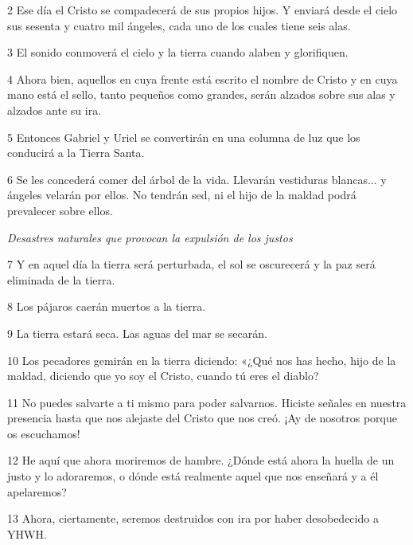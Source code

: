 \par 2 Ese día el Cristo se compadecerá de sus propios hijos. Y enviará desde el cielo sus sesenta y cuatro mil ángeles, cada uno de los cuales tiene seis alas.

\par 3 El sonido conmoverá el cielo y la tierra cuando alaben y glorifiquen.

\par 4 Ahora bien, aquellos en cuya frente está escrito el nombre de Cristo y en cuya mano está el sello, tanto pequeños como grandes, serán alzados sobre sus alas y alzados ante su ira.

\par 5 Entonces Gabriel y Uriel se convertirán en una columna de luz que los conducirá a la Tierra Santa.

\par 6 Se les concederá comer del árbol de la vida. Llevarán vestiduras blancas... y ángeles velarán por ellos. No tendrán sed, ni el hijo de la maldad podrá prevalecer sobre ellos.

\par \textit{Desastres naturales que provocan la expulsión de los justos}

\par 7 Y en aquel día la tierra será perturbada, el sol se oscurecerá y la paz será eliminada de la tierra.

\par 8 Los pájaros caerán muertos a la tierra.

\par 9 La tierra estará seca. Las aguas del mar se secarán.

\par 10 Los pecadores gemirán en la tierra diciendo: «¿Qué nos has hecho, hijo de la maldad, diciendo que yo soy el Cristo, cuando tú eres el diablo?

\par 11 No puedes salvarte a ti mismo para poder salvarnos. Hiciste señales en nuestra presencia hasta que nos alejaste del Cristo que nos creó. ¡Ay de nosotros porque os escuchamos!

\par 12 He aquí que ahora moriremos de hambre. ¿Dónde está ahora la huella de un justo y lo adoraremos, o dónde está realmente aquel que nos enseñará y a él apelaremos?

\par 13 Ahora, ciertamente, seremos destruidos con ira por haber desobedecido a YHWH.

